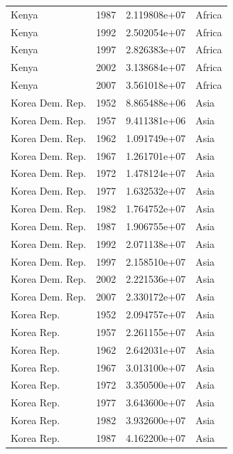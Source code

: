 \documentclass[
  letterpaper,
  DIV=11,
  numbers=noendperiod]{scrreprt}
\begin{document}
\begin{tcolorbox}
\begin{tabular}{lrrl}
Kenya                    &  1987 &  2.119808e+07 &    Africa \\
Kenya                    &  1992 &  2.502054e+07 &    Africa \\
Kenya                    &  1997 &  2.826383e+07 &    Africa \\
Kenya                    &  2002 &  3.138684e+07 &    Africa \\
Kenya                    &  2007 &  3.561018e+07 &    Africa \\
Korea Dem. Rep.          &  1952 &  8.865488e+06 &      Asia \\
Korea Dem. Rep.          &  1957 &  9.411381e+06 &      Asia \\
Korea Dem. Rep.          &  1962 &  1.091749e+07 &      Asia \\
Korea Dem. Rep.          &  1967 &  1.261701e+07 &      Asia \\
Korea Dem. Rep.          &  1972 &  1.478124e+07 &      Asia \\
Korea Dem. Rep.          &  1977 &  1.632532e+07 &      Asia \\
Korea Dem. Rep.          &  1982 &  1.764752e+07 &      Asia \\
Korea Dem. Rep.          &  1987 &  1.906755e+07 &      Asia \\
Korea Dem. Rep.          &  1992 &  2.071138e+07 &      Asia \\
Korea Dem. Rep.          &  1997 &  2.158510e+07 &      Asia \\
Korea Dem. Rep.          &  2002 &  2.221536e+07 &      Asia \\
Korea Dem. Rep.          &  2007 &  2.330172e+07 &      Asia \\
Korea Rep.               &  1952 &  2.094757e+07 &      Asia \\
Korea Rep.               &  1957 &  2.261155e+07 &      Asia \\
Korea Rep.               &  1962 &  2.642031e+07 &      Asia \\
Korea Rep.               &  1967 &  3.013100e+07 &      Asia \\
Korea Rep.               &  1972 &  3.350500e+07 &      Asia \\
Korea Rep.               &  1977 &  3.643600e+07 &      Asia \\
Korea Rep.               &  1982 &  3.932600e+07 &      Asia \\
Korea Rep.               &  1987 &  4.162200e+07 &      Asia \\

\end{tabular}
\end{tcolorbox}
\end{document}
